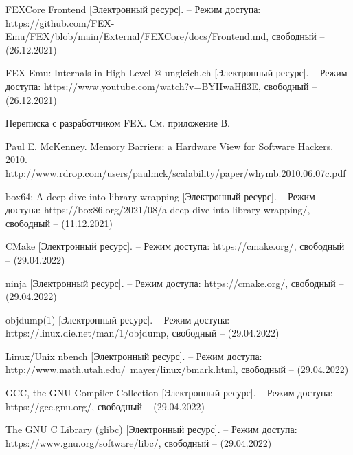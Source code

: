 \begin{thebibliography}{}
FEXCore Frontend [Электронный ресурс]. -- Режим доступа: 	https://github.com/FEX-Emu/FEX/blob/main/External/FEXCore/docs/Frontend.md,
свободный -- (26.12.2021)	

FEX-Emu: Internals in High Level @ ungleich.ch [Электронный ресурс]. -- Режим доступа: 		https://www.youtube.com/watch?v=BYIIwaHfl3E,
свободный -- (26.12.2021)

Переписка с разработчиком FEX. См. приложение В.

	Paul E. McKenney. Memory Barriers: a Hardware View for Software Hackers. 2010. http://www.rdrop.com/users/paulmck/scalability/paper/whymb.2010.06.07c.pdf
	
	
box64: A deep dive into library wrapping [Электронный ресурс]. -- Режим доступа: https://box86.org/2021/08/a-deep-dive-into-library-wrapping/,
свободный -- (11.12.2021)
	

	CMake [Электронный ресурс]. -- Режим доступа: https://cmake.org/, свободный -- (29.04.2022)

	ninja [Электронный ресурс]. -- Режим доступа: https://cmake.org/, свободный -- (29.04.2022)


	objdump(1) [Электронный ресурс]. -- Режим доступа: https://linux.die.net/man/1/objdump, свободный -- (29.04.2022)


	Linux/Unix nbench [Электронный ресурс]. -- Режим доступа: http://www.math.utah.edu/~mayer/linux/bmark.html, свободный -- (29.04.2022)
	
	GCC, the GNU Compiler Collection [Электронный ресурс]. -- Режим доступа: https://gcc.gnu.org/, свободный -- (29.04.2022)	

	The GNU C Library (glibc) [Электронный ресурс]. -- Режим доступа: https://www.gnu.org/software/libc/, свободный -- (29.04.2022)


	
\end{thebibliography}
\endgroup

\pagebreak